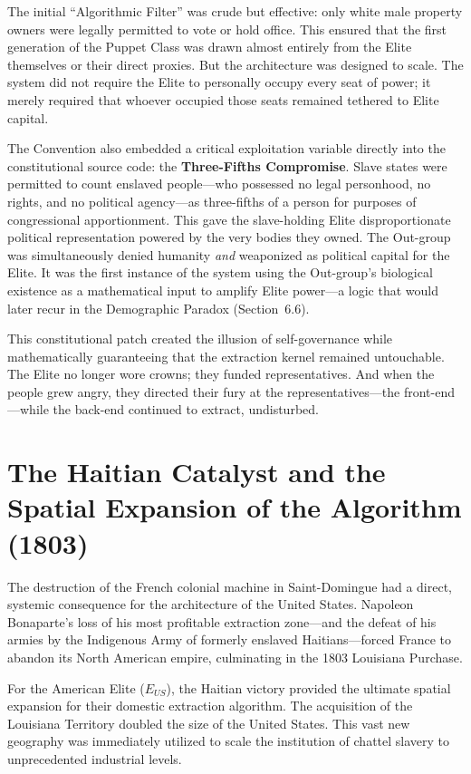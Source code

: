 \documentclass[12pt,openany]{book}
\begin{document}
The initial ``Algorithmic Filter'' was crude but effective: only white male property owners were legally permitted to vote or hold office. This ensured that the first generation of the Puppet Class was drawn almost entirely from the Elite themselves or their direct proxies. But the architecture was designed to scale. The system did not require the Elite to personally occupy every seat of power; it merely required that whoever occupied those seats remained tethered to Elite capital.

The Convention also embedded a critical exploitation variable directly into the constitutional source code: the \textbf{Three-Fifths Compromise}. Slave states were permitted to count enslaved people---who possessed no legal personhood, no rights, and no political agency---as three-fifths of a person for purposes of congressional apportionment. This gave the slave-holding Elite disproportionate political representation powered by the very bodies they owned. The Out-group was simultaneously denied humanity \textit{and} weaponized as political capital for the Elite. It was the first instance of the system using the Out-group's biological existence as a mathematical input to amplify Elite power---a logic that would later recur in the Demographic Paradox (Section~6.6).

This constitutional patch created the illusion of self-governance while mathematically guaranteeing that the extraction kernel remained untouchable. The Elite no longer wore crowns; they funded representatives. And when the people grew angry, they directed their fury at the representatives---the front-end---while the back-end continued to extract, undisturbed.

\section{The Haitian Catalyst and the Spatial Expansion of the Algorithm (1803)}

The destruction of the French colonial machine in Saint-Domingue had a direct, systemic consequence for the architecture of the United States. Napoleon Bonaparte’s loss of his most profitable extraction zone—and the defeat of his armies by the Indigenous Army of formerly enslaved Haitians—forced France to abandon its North American empire, culminating in the 1803 Louisiana Purchase.

For the American Elite ($E_{US}$), the Haitian victory provided the ultimate spatial expansion for their domestic extraction algorithm. The acquisition of the Louisiana Territory doubled the size of the United States. This vast new geography was immediately utilized to scale the institution of chattel slavery to unprecedented industrial levels.
\end{document}
